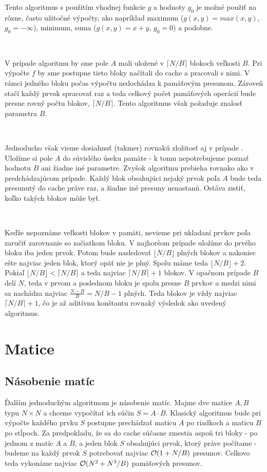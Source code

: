 Tento algoritmus s použitím vhodnej funkcie $g$ a hodnoty $g_0$ je možné použiť na rôzne, často užitočné výpočty, ako napríklad maximum ($g(x, y) = max(x, y)$, $g_0 = -\infty$), minimum, suma ($g(x,y) = x+y$, $g_0 = 0$) a podobne.

\

V prípade \aware algoritmu by sme pole $A$ mali uložené v $\lceil N/B \rceil$ blokoch veľkosti $B$. Pri výpočte $f$ by sme postupne tieto bloky načítali do cache a pracovali s nimi. V rámci jedného bloku počas výpočtu nedochádza k pamäťovým presunom. Zároveň stačí každý prvok spracovať raz a teda celkový počet pamäťových operácií bude presne rovný počtu blokov, $\lceil N/B \rceil$. Tento algoritmus však požaduje znalosť parametra $B$.

\

Jednoducho však vieme dosiahnuť (takmer) rovnakú zložitosť aj v prípade \obliv. Uložíme si pole $A$ do súvislého úseku pamäte - k tomu nepotrebujeme poznať hodnotu $B$ ani žiadne iné parametre. Zvyšok algoritmu prebieha rovnako ako v predchádzajúcom prípade. Každý blok obsahujúci nejaký prvok poľa $A$ bude teda presunutý do cache práve raz, a žiadne iné presuny nenastanú. Ostáva zistiť, koľko takých blokov môže byť.

\

Keďže nepoznáme veľkosti blokov v pamäti, nevieme pri ukladaní prvkov poľa zaručiť zarovnanie so začiatkom bloku. V najhoršom prípade uložíme do prvého bloku iba jeden prvok. Potom bude nasledovať $\lfloor N/B \rfloor$ plných blokov a nakoniec ešte najviac jeden blok, ktorý opäť nie je plný. Spolu máme teda $\lfloor N/B \rfloor + 2$. Pokiaľ $\lfloor N/B \rfloor < \lceil N/B \rceil$ a teda najviac $\lceil N/B \rceil + 1$ blokov. V opačnom prípade $B$ delí $N$, teda v prvom a poslednom bloku je spolu presne $B$ prvkov a medzi nimi sa nachádza najviac $\frac{N-B}{B} = N/B - 1$ plných. Teda blokov je vždy najviac $\lceil N/B \rceil +1$, čo je až aditívnu konštantu rovnaký výsledok ako uvedený \aware algoritmus.

\section{Matice}

\subsection{Násobenie matíc}

Ďalším jednoduchým \obliv algoritmom je násobenie matíc. Majme dve matice $A, B$ typu $N \times N$ a chceme vypočítať ich súčin $S = A \cdot B$. Klasický algoritmus bude pri výpočte každého prvku $S$ postupne prechádzať maticu $A$ po riadkoch a maticu $B$ po stĺpoch. Za predpokladu, že sa do cache súčasne zmestia aspoň tri bloky - po jednom z matíc $A$ a $B$, a jeden blok $S$ obsahujúci prvok, ktorý práve počítame - budeme na každý prvok $S$ potrebovať najviac $\mathcal{O}(1+N/B)$ presunov. Celkovo teda vykonáme najviac $\mathcal{O}(N^2 + N^3/B)$ pamäťových presunov. 

